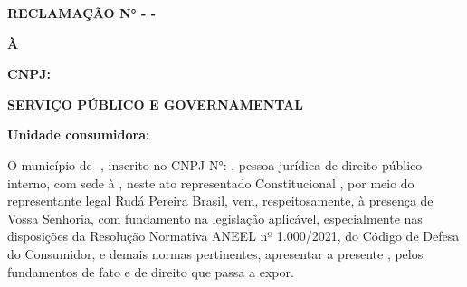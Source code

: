 \textbf{RECLAMAÇÃO N° \numReclamacao{} - \nomeMunicipio{} - \siglaEstado{}}

\textbf{À \nomeConcessionaria{}}

\textbf{CNPJ: \cnpjConcessionaria{}}

\textbf{SERVIÇO PÚBLICO E GOVERNAMENTAL}

\textbf{Unidade consumidora: \unidadeConsumidora{}}

\vspace{0,25cm}

O  município de \nomeMunicipio{}-\siglaEstado{}, inscrito no CNPJ N°: \cnpjMunicipio{}, pessoa jurídica de direito público interno, com sede à \sedePrefeitura{}, neste ato representado \generoPrefeitura{} Constitucional \nomePrefeito{}, por meio do representante legal Rudá Pereira Brasil, vem, respeitosamente, à presença de Vossa Senhoria, com fundamento na legislação aplicável, especialmente nas disposições da Resolução Normativa ANEEL nº 1.000/2021, do Código de Defesa do Consumidor, e demais normas pertinentes, apresentar a presente \textbf{\Reclamacao{}}, pelos fundamentos de fato e de direito que passa a expor.